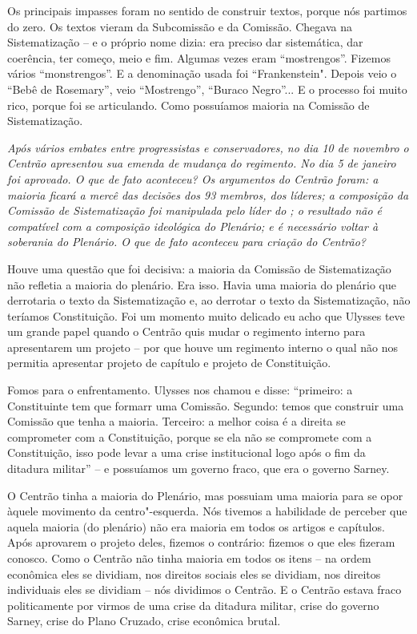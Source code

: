 Os principais impasses foram no sentido de construir
textos, porque nós partimos do zero. Os textos vieram da Subcomissão e
da Comissão. Chegava na Sistematização -- e o próprio nome dizia: era
preciso dar sistemática, dar coerência, ter começo, meio e fim. Algumas
vezes eram ``mostrengos''. Fizemos vários ``monstrengos''. E a
denominação usada foi ``Frankenstein". Depois veio o ``Bebê de
Rosemary'', veio ``Mostrengo'', ``Buraco Negro''... E o processo foi
muito rico, porque foi se articulando. Como possuíamos maioria na
Comissão de Sistematização.

\medskip

\noindent\emph{Após vários embates entre progressistas e conservadores, no dia
10 de novembro o Centrão apresentou sua emenda de mudança do regimento.
No dia 5 de janeiro foi aprovado. O que de fato aconteceu? Os argumentos
do Centrão foram: a maioria ficará a mercê das decisões dos 93 membros,
dos líderes; a composição da Comissão de Sistematização foi manipulada
pelo líder do ; o resultado não é compatível com a composição
ideológica do Plenário; e é necessário voltar à soberania do Plenário. O
que de fato aconteceu para criação do Centrão?}

Houve uma questão que foi decisiva: a maioria da
Comissão de Sistematização não refletia a maioria do plenário. Era isso.
Havia uma maioria do plenário que derrotaria o texto da Sistematização
e, ao derrotar o texto da Sistematização, não teríamos Constituição. Foi
um momento muito delicado eu acho que Ulysses teve um grande papel
quando o Centrão quis mudar o regimento interno para apresentarem um
projeto -- por que houve um regimento interno o qual não nos permitia
apresentar projeto de capítulo e projeto de Constituição.

Fomos para o enfrentamento. Ulysses nos chamou e disse: ``primeiro: a
Constituinte tem que formarr uma Comissão. Segundo: temos que construir
uma Comissão que tenha a maioria. Terceiro: a melhor coisa é a direita
se comprometer com a Constituição, porque se ela não se compromete com a
Constituição, isso pode levar a uma crise institucional logo após o fim
da ditadura militar'' -- e possuíamos um governo fraco, que era o
governo Sarney.

O Centrão tinha a maioria do Plenário, mas possuiam uma maioria para se
opor àquele movimento da centro"-esquerda. Nós tivemos a habilidade de
perceber que aquela maioria (do plenário) não era maioria em todos os
artigos e capítulos. Após aprovarem o projeto deles, fizemos o
contrário: fizemos o que eles fizeram conosco. Como o Centrão não tinha
maioria em todos os itens -- na ordem econômica eles se dividiam, nos
direitos sociais eles se dividiam, nos direitos individuais eles se
dividiam -- nós dividimos o Centrão. E o Centrão estava fraco
politicamente por virmos de uma crise da ditadura militar, crise do
governo Sarney, crise do Plano Cruzado, crise econômica brutal.

